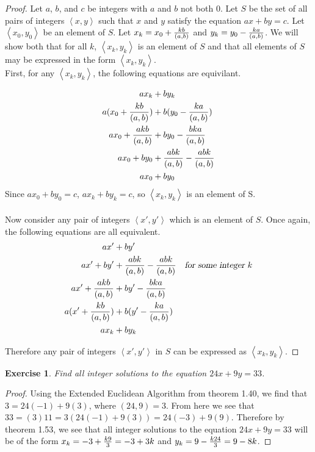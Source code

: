 \documentclass[12pt,leqno]{article}
\numberwithin{equation}{section}
\newtheorem{exer}[thm]{Exercise}
\theoremstyle{definition}
\newcommand{\pair}[2]{\left\langle #1, #2 \right\rangle}
\begin{document}
\begin{proof}[Proof]
Let $a$, $b$, and $c$ be integers with $a$ and $b$ not both $0$.  Let $S$ be the set of all pairs of integers $\pair{x}{y}$ such that $x$ and $y$ satisfy the equation $ax + by = c$.  Let $\pair{x_0}{y_0}$ be an element of $S$.  Let $x_k = x_0 + {kb \over (a, b)}$ and $y_k = y_0 - {ka \over (a, b)}$.  We will show both that for all $k$, $\pair{x_k}{y_k}$ is an element of $S$ and that all elements of $S$ may be expressed in the form $\pair{x_k}{y_k}$.\pagebreak \\
First, for any $\pair{x_k}{y_k}$, the following equations are equivilant.

\begin{align*}
ax_k &+ by_k\\
a(x_0 + {kb \over (a, b)}) &+ b(y_0 - {ka \over (a, b)})\\
ax_0 + {akb \over (a, b)} &+ by_0 - {bka \over (a, b)} \\
ax_0 + by_0 &+ {abk \over (a, b)} - {abk \over (a, b)}\\
ax_0 &+ by_0
\end{align*}
Since $ax_0 + by_0 = c$, $ax_k + by_k = c$, so $\pair{x_k}{y_k}$ is an element of S.\\
\\

Now consider any pair of integers $\pair{x'}{y'}$ which is an element of $S$.  Once again, the following equations are all equivalent.
\begin{align*}
ax' &+ by'\\
ax' + by' &+ {abk \over (a, b)} - {abk \over (a, b)} &\textsl{for some integer}\ k\\
ax' + {akb \over (a, b)} &+ by' - {bka \over (a, b)}\\
a(x' + {kb \over (a, b)}) &+ b(y' - {ka \over (a, b)})\\
ax_k &+ by_k
\end{align*}

Therefore any pair of integers $\pair{x'}{y'}$ in $S$ can be expressed as $\pair{x_k}{y_k}$.
\end{proof}

\begin{exer}
Find all integer solutions to the equation $24x+9y=33$.
\end{exer}

\begin{proof}[Proof]
Using the Extended Euclidean Algorithm from theorem 1.40, we find that $3 = 24(-1) + 9(3)$, where $(24, 9) = 3$.  From here we see that $33 = (3)11 = 3(24(-1) + 9(3)) = 24(-3) + 9(9)$.  Therefore by theorem 1.53, we see that all integer solutions to the equation $24x+9y=33$ will be of the form $x_k = -3 + {k9 \over 3} = -3 + 3k$ and $y_k = 9 - {k24 \over 3} = 9 - 8k$.
\end{proof}
\end{document}
